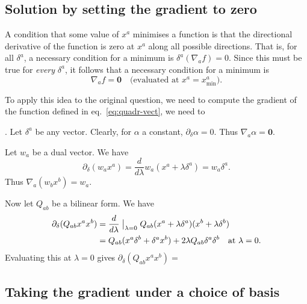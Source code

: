 \documentclass[10pt, a4paper]{article}
\newcommand{\bzero}{\mathbold{0}} %
\begin{document}
\subsection{Solution by setting the gradient to zero}

A condition that some value of $x^a$ minimises a function is that the
directional derivative of the function is zero at $x^a$ along all
possible directions. That is, for all $\delta^a$, a necessary condition for
a minimum is $\delta^a(\nabla_a f)=0$. Since this must be true for \emph{every}
$\delta^a$, it follows that a necessary condition for a minimum is
\begin{equation*}
  \nabla_a f = \bzero \quad\text{(evaluated at $x^a = x^a_\text{min}$)}.
\end{equation*}

To apply this idea to the original question, we need to compute the
gradient of the function defined in  
eq.~\eqref{eq:quadr-vect}, we need to 


.  Let $\delta^a$ be any vector. Clearly, for
$\alpha$ a constant, $\partial_\delta \alpha=0$. Thus $\nabla_a \alpha=\bzero$.

Let $w_a$ be a dual vector. We have
\begin{equation*}
  \partial_\delta (w_ax^a) = \frac{d}{d\lambda} w_a(x^a + \lambda \delta^a) = w_a\delta^a.
\end{equation*}
Thus $\nabla_a (w_b x^b) = w_a$.

Now let $Q_{ab}$ be a bilinear form. We have
\begin{align*}
  \partial_\delta (Q_{ab}x^ax^b) &= \frac{d}{d\lambda}\bigm|_{\lambda=0} Q_{ab}(x^a+\lambda\delta^a)(x^b+\lambda\delta^b) \\
  &= Q_{ab}(x^a\delta^b + \delta^ax^b) + 2\lambda Q_{ab}\delta^a\delta^b \quad\text{at $\lambda=0$}.
\end{align*}
Evaluating this at $\lambda=0$ gives $\partial_\delta (Q_{ab}x^ax^b)=$




\subsection{Taking the gradient under a choice of basis}

\printbibliography
\end{document}
